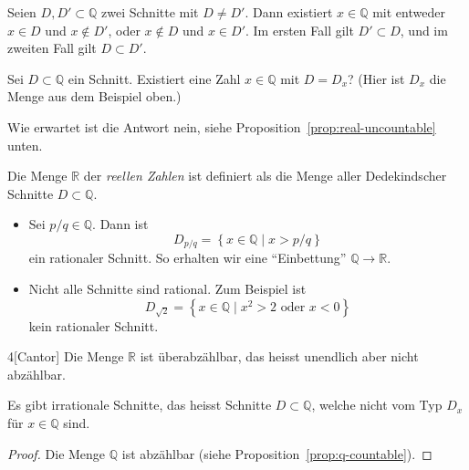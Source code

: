 \documentclass[../main.tex]{subfiles}
\begin{document}
\begin{remark}
  Seien $D, D' \subset \mathbb Q$ zwei Schnitte mit $D \neq D'$.
  Dann existiert $x \in \mathbb Q$ mit entweder $x \in D$ und $x \notin D'$,
  oder $x \notin D$ und $x \in D'$.
  Im ersten Fall gilt $D' \subset D$, und im zweiten Fall gilt $D \subset D'$.
\end{remark}

\begin{question}
  Sei $D \subset \mathbb Q$ ein Schnitt. Existiert
  eine Zahl $x \in \mathbb Q$ mit $D = D_{x}$?
  (Hier ist $D_{x}$ die Menge aus dem Beispiel oben.)
\end{question}

Wie erwartet ist die Antwort nein, siehe Proposition~\ref{prop:real-uncountable} unten.

\begin{definition}
  Die Menge $\mathbb R$ der \emph{reellen Zahlen} ist definiert als die Menge
  aller Dedekindscher Schnitte $D \subset \mathbb Q$.
\end{definition}

\begin{examples}
  \leavevmode
  \begin{itemize}
    \item Sei $p/q \in \mathbb Q$. Dann ist
      \[ D_{p/q} = \left\{x \in \mathbb Q \mid x> p/q \right\}\]
      ein rationaler Schnitt. So erhalten wir eine ``Einbettung''
      $\mathbb Q \to \mathbb R$.
    \item Nicht alle Schnitte sind rational. Zum Beispiel ist
      \[D_{\sqrt 2} = \left\{x \in \mathbb Q \mid x^{2} > 2 \text{ oder } x < 0\right\}\]
      kein rationaler Schnitt.
  \end{itemize}
\end{examples}

\begin{manualproposition}{4}[Cantor]\label{prop:real-uncountable}
  Die Menge $\mathbb R$ ist überabzählbar, das heisst unendlich
  aber nicht abzählbar.
\end{manualproposition}

\begin{corollary}
  Es gibt irrationale Schnitte, das heisst Schnitte $D \subset \mathbb Q$,
  welche nicht vom Typ $D_{x}$ für $x \in \mathbb Q$ sind.
\end{corollary}

\begin{proof}
  Die Menge $\mathbb Q$ ist abzählbar (siehe Proposition~\ref{prop:q-countable}).
\end{proof}
\end{document}
